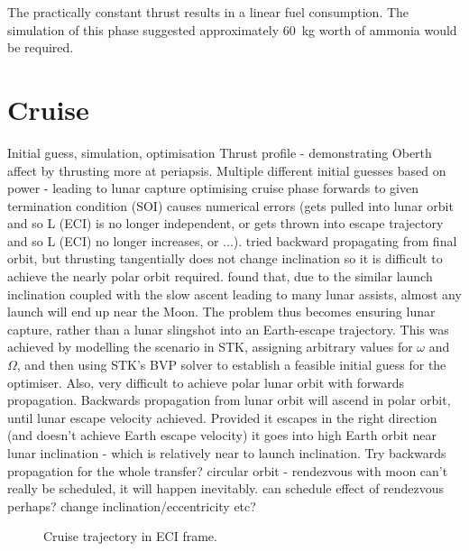 The practically constant thrust results in a linear fuel consumption. The simulation of this phase suggested approximately 60~kg worth of ammonia would be required. %

%


\clearpage

\section{Cruise}
Initial guess, simulation, optimisation
Thrust profile - demonstrating Oberth affect by thrusting more at periapsis.
Multiple different initial guesses based on power - leading to lunar capture
optimising cruise phase forwards to given termination condition (SOI) causes numerical errors (gets pulled into lunar orbit and so L (ECI) is no longer independent, or gets thrown into escape trajectory and so L (ECI) no longer increases, or ...).
tried backward propagating from final orbit, but thrusting tangentially does not change inclination so it is difficult to achieve the nearly polar orbit required.
found that, due to the similar launch inclination coupled with the slow ascent leading to many lunar assists, almost any launch will end up near the Moon. The problem thus becomes ensuring lunar capture, rather than a lunar slingshot into an Earth-escape trajectory. This was achieved by modelling the scenario in STK, assigning arbitrary values for $\omega$ and $\Omega$, and then using STK's BVP solver to establish a feasible initial guess for the optimiser. 
Also, very difficult to achieve polar lunar orbit with forwards propagation. Backwards propagation from lunar orbit will ascend in polar orbit, until lunar escape velocity achieved. Provided it escapes in the right direction (and doesn't achieve Earth escape velocity) it goes into high Earth orbit near lunar inclination - which is relatively near to launch inclination. Try backwards propagation for the whole transfer?
circular orbit - rendezvous with moon can't really be scheduled, it will happen inevitably. can schedule effect of rendezvous perhaps? change inclination/eccentricity etc?

\begin{figure}
\centering
\def\svgwidth{\figurewidth}

\caption{Cruise trajectory in ECI frame.}
\label{fig:Cruise-3D}
\end{figure}

